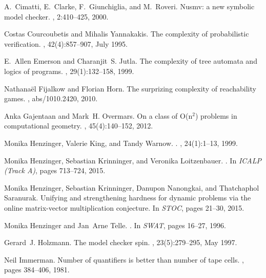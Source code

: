 \documentclass[11pt,letterpaper]{article}
\begin{document}
\begin{thebibliography}{10}
A.~Cimatti, E.~Clarke, F.~Giunchiglia, and M.~Roveri.
\newblock Nusmv: a new symbolic model checker.
, 2:410--425, 2000.

Costas Courcoubetis and Mihalis Yannakakis.
\newblock The complexity of probabilistic verification.
, 42(4):857--907, July 1995.

E.~Allen Emerson and Charanjit~S. Jutla.
\newblock The complexity of tree automata and logics of programs.
, 29(1):132--158, 1999.

Nathana{\"{e}}l Fijalkow and Florian Horn.
\newblock The surprizing complexity of reachability games.
, abs/1010.2420, 2010.

Anka Gajentaan and Mark~H. Overmars.
\newblock On a class of {O}(n\({}^{\mbox{2}}\)) problems in computational
  geometry.
, 45(4):140--152, 2012.

Monika Henzinger, Valerie King, and Tandy Warnow.
.
, 24(1):1--13, 1999.

Monika Henzinger, Sebastian Krinninger, and Veronika Loitzenbauer.
.
\newblock In {\em {ICALP (Track A)}}, pages 713--724, 2015.

Monika Henzinger, Sebastian Krinninger, Danupon Nanongkai, and Thatchaphol
  Saranurak.
\newblock Unifying and strengthening hardness for dynamic problems via the
  online matrix-vector multiplication conjecture.
\newblock In {\em {STOC}}, pages 21--30, 2015.

Monika Henzinger and Jan~Arne Telle.
.
\newblock In {\em SWAT}, pages 16--27, 1996.

Gerard~J. Holzmann.
\newblock The model checker spin.
, 23(5):279--295, May 1997.

Neil Immerman.
\newblock Number of quantifiers is better than number of tape cells.
, pages 384--406, 1981.


\end{thebibliography}
\end{document}
